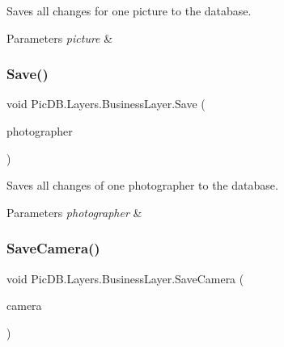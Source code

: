Saves all changes for one picture to the database. 


\begin{DoxyParams}{Parameters}
{\em picture} & \\
\hline
\end{DoxyParams}
\mbox{\label{class_pic_d_b_1_1_layers_1_1_business_layer_a480f62efec10414b2e387200b9da9682}} 
\subsubsection{\texorpdfstring{Save()}{Save()}\hspace{0.1cm}{\footnotesize\ttfamily [2/2]}}
{\footnotesize\ttfamily void Pic\+D\+B.\+Layers.\+Business\+Layer.\+Save (\begin{DoxyParamCaption}\item[{I\+Photographer\+Model}]{photographer }\end{DoxyParamCaption})}



Saves all changes of one photographer to the database. 


\begin{DoxyParams}{Parameters}
{\em photographer} & \\
\hline
\end{DoxyParams}
\mbox{\label{class_pic_d_b_1_1_layers_1_1_business_layer_a0827e099cb6e0a91995b99e7809bcbf8}} 
\subsubsection{\texorpdfstring{Save\+Camera()}{SaveCamera()}}
{\footnotesize\ttfamily void Pic\+D\+B.\+Layers.\+Business\+Layer.\+Save\+Camera (\begin{DoxyParamCaption}\item[{\mbox{\hyperlink{class_pic_d_b_1_1_models_1_1_camera_model}{Camera\+Model}}}]{camera }\end{DoxyParamCaption})}



